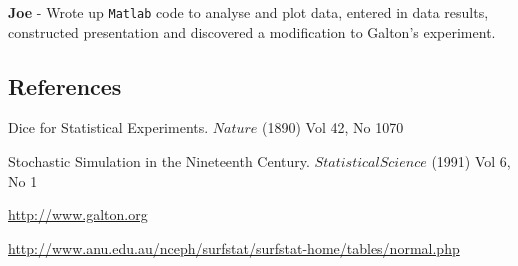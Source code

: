 \noindent
\textbf{Joe} - Wrote up {\tt Matlab} code to analyse and plot data, entered in data results, constructed presentation and discovered a modification to Galton's experiment.  


\subsection*{References}
Dice for Statistical Experiments. $Nature$ (1890) Vol 42, No 1070

\noindent
Stochastic Simulation in the Nineteenth Century. $Statistical Science$ (1991) Vol 6, No 1

\noindent
\url{http://www.galton.org}

\noindent
\url{http://www.anu.edu.au/nceph/surfstat/surfstat-home/tables/normal.php}

